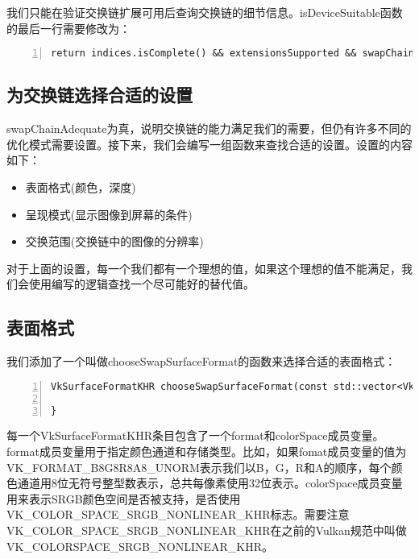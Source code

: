 \documentclass{ctexart}
\begin{document}
我们只能在验证交换链扩展可用后查询交换链的细节信息。isDeviceSuitable函数的最后一行需要修改为：

\begin{lstlisting}[language={[ANSI]C},keywordstyle=\color{blue!70},commentstyle=\color{red!50!green!50!blue!50},frame=shadowbox, rulesepcolor=\color{red!20!green!20!blue!20},basicstyle=\small,numbers=left, numberstyle=\tiny,breaklines=true]
return indices.isComplete() && extensionsSupported && swapChainAdequate;
\end{lstlisting}

\subsection{为交换链选择合适的设置}

swapChainAdequate为真，说明交换链的能力满足我们的需要，但仍有许多不同的优化模式需要设置。接下来，我们会编写一组函数来查找合适的设置。设置的内容如下：

\begin{itemize}
	\item 表面格式(颜色，深度)
	\item 呈现模式(显示图像到屏幕的条件)
	\item 交换范围(交换链中的图像的分辨率)
\end{itemize}

对于上面的设置，每一个我们都有一个理想的值，如果这个理想的值不能满足，我们会使用编写的逻辑查找一个尽可能好的替代值。

\subsection{表面格式}

我们添加了一个叫做chooseSwapSurfaceFormat的函数来选择合适的表面格式：

\begin{lstlisting}[language={[ANSI]C},keywordstyle=\color{blue!70},commentstyle=\color{red!50!green!50!blue!50},frame=shadowbox, rulesepcolor=\color{red!20!green!20!blue!20},basicstyle=\small,numbers=left, numberstyle=\tiny,breaklines=true]
VkSurfaceFormatKHR chooseSwapSurfaceFormat(const std::vector<VkSurfaceFormatKHR> &availableFormats) {

}
\end{lstlisting}

每一个VkSurfaceFormatKHR条目包含了一个format和colorSpace成员变量。format成员变量用于指定颜色通道和存储类型。比如，如果fomat成员变量的值为VK\_FORMAT\_B8G8R8A8\_UNORM表示我们以B，G，R和A的顺序，每个颜色通道用8位无符号整型数表示，总共每像素使用32位表示。colorSpace成员变量用来表示SRGB颜色空间是否被支持，是否使用VK\_COLOR\_SPACE\_SRGB\_NONLINEAR\_KHR标志。需要注意VK\_COLOR\_SPACE\_SRGB\_NONLINEAR\_KHR在之前的Vulkan规范中叫做VK\_COLORSPACE\_SRGB\_NONLINEAR\_KHR。
\end{document}
